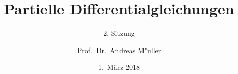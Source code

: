 \documentclass{beamer}
\title[]{Partielle Differentialgleichungen}
\subtitle{2. Sitzung}
\date[1.~März 2018]{1.~März 2018}
\author{Prof.~Dr.~Andreas M"uller}
\begin{document}
\begin{frame}
\titlepage
\end{frame}


\end{document}

